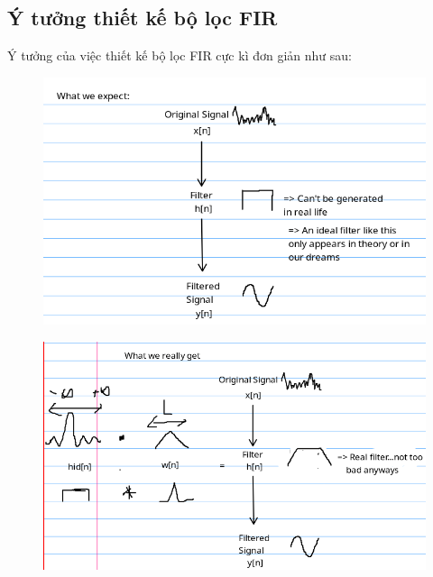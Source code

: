 \documentclass{article}
\begin{document}
\subsection{Ý tưởng thiết kế bộ lọc FIR}
Ý tưởng của việc thiết kế bộ lọc FIR cực kì đơn giản như sau:
\begin{figure}[H]
  \begin{center}
  \includegraphics[width=16cm]{8.png}
  \end{center}
\end{figure}
\begin{figure}[H]
  \begin{center}
  \includegraphics[width=16cm]{9.png}
  \end{center}
\end{figure}
\end{document}
